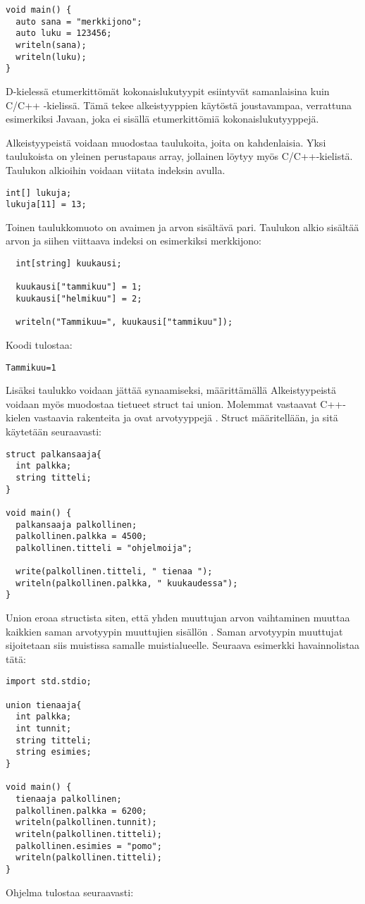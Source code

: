 \documentclass[11pt,oneside,a4paper]{article}
\begin{document}
\begin{verbatim}
void main() {
  auto sana = "merkkijono";
  auto luku = 123456;
  writeln(sana);
  writeln(luku);
}
\end{verbatim}

D-kielessä etumerkittömät kokonaislukutyypit esiintyvät samanlaisina kuin C/C++
-kielissä. Tämä tekee alkeistyyppien käytöstä joustavampaa, verrattuna
esimerkiksi Javaan, joka ei sisällä etumerkittömiä kokonaislukutyyppejä.

Alkeistyypeistä voidaan muodostaa taulukoita, joita on kahdenlaisia. Yksi
taulukoista on yleinen perustapaus array, jollainen löytyy myös C/C++-kielistä.
Taulukon alkioihin voidaan viitata indeksin avulla.
\begin{verbatim}
int[] lukuja;
lukuja[11] = 13;
\end{verbatim}

Toinen taulukkomuoto on avaimen ja arvon sisältävä pari. Taulukon alkio sisältää
arvon ja siihen viittaava indeksi on esimerkiksi merkkijono: 
\begin{verbatim}
  int[string] kuukausi;
  
  kuukausi["tammikuu"] = 1;
  kuukausi["helmikuu"] = 2;
  
  writeln("Tammikuu=", kuukausi["tammikuu"]);
\end{verbatim}
Koodi tulostaa:
\begin{verbatim}
Tammikuu=1
\end{verbatim}

Lisäksi taulukko voidaan jättää synaamiseksi, määrittämällä 
Alkeistyypeistä voidaan myös muodostaa tietueet struct tai union. Molemmat
vastaavat C++-kielen vastaavia rakenteita ja ovat arvotyyppejä \cite{DLA13}.
Struct määritellään, ja sitä käytetään seuraavasti:

\begin{verbatim}
struct palkansaaja{
  int palkka;
  string titteli;
}

void main() {
  palkansaaja palkollinen;
  palkollinen.palkka = 4500;
  palkollinen.titteli = "ohjelmoija";

  write(palkollinen.titteli, " tienaa ");
  writeln(palkollinen.palkka, " kuukaudessa");
}
\end{verbatim}

Union eroaa structista siten, että yhden muuttujan arvon vaihtaminen muuttaa
kaikkien saman arvotyypin muuttujien sisällön \cite{ALE10}. Saman arvotyypin
muuttujat sijoitetaan siis muistissa samalle muistialueelle. Seuraava esimerkki
havainnolistaa tätä:
\begin{verbatim}
import std.stdio;

union tienaaja{
  int palkka;
  int tunnit;
  string titteli;
  string esimies;
}

void main() {
  tienaaja palkollinen;
  palkollinen.palkka = 6200;
  writeln(palkollinen.tunnit);
  writeln(palkollinen.titteli);
  palkollinen.esimies = "pomo";
  writeln(palkollinen.titteli);
}
\end{verbatim}
Ohjelma tulostaa seuraavasti:
\end{document}

